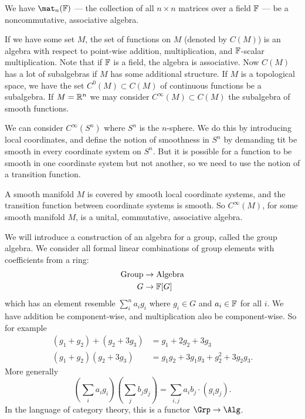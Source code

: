 \begin{ex}
We have $\mat_{n}(\Bbb{F})$ --- the collection of all $n\times n$
matrices over a field $\Bbb{F}$ --- be a noncommutative,
associative algebra.
\end{ex}
\begin{ex}
If we have some set $M$, the set of functions on $M$ (denoted by
$C(M)$) is an algebra with respect to point-wise addition,
multiplication, and $\Bbb{F}$-scalar multiplication. Note that if
$\Bbb{F}$ is a field, the algebra is associative. Now $C(M)$ has
a lot of subalgebras if $M$ has some additional structure. If $M$
is a topological space, we have the set $C^0(M)\subset C(M)$ of
continuous functions be a subalgebra. If $M=\Bbb{R}^{n}$ we may
consider $C^{\infty}(M)\subset C(M)$ the subalgebra of smooth functions.
\end{ex}
\begin{ex}
We can consider $C^{\infty}(S^{n})$ where $S^n$ is the
$n$-sphere. We do this by introducing local coordinates, and
define the notion of smoothness in $S^n$ by demanding tit be
smooth in every coordinate system on $S^n$. But it is possible
for a function to be smooth in one coordinate system but not
another, so we need to use the notion of a transition function.
\end{ex}

A smooth manifold $M$ is covered by smooth local coordinate
systems, and the transition function between coordinate systems
is smooth. So $C^{\infty}(M)$, for some smooth manifold $M$, is a
unital, commutative, associative algebra.

We will introduce a construction of an algebra for a group,
called the group algebra. We consider all formal linear
combinations of group elements with coefficients from a ring:
\begin{align}
\hbox{Group}&\to\hbox{Algebra}\nonumber\\
G&\to\Bbb{F}[G]
\end{align}
which has an element resemble $\sum_{i}^{n}a_{i}g_{i}$ where
$g_{i}\in G$ and $a_{i}\in\Bbb{F}$ for all $i$. We have addition
be component-wise, and multiplication also be component-wise.
So for example
\begin{subequations}
\begin{align}
(g_{1}+g_{2})+(g_{2}+3g_{3}) &= g_{1}+2g_{2}+3g_{3}\\
(g_{1}+g_{2})(g_{2}+3g_{3}) &= g_{1}g_{2}+3g_{1}g_{3}+g_{2}^{2}+3g_{2}g_{3}.
\end{align}
\end{subequations}
More generally
\begin{equation}
(\sum_{i}a_{i}g_{i})(\sum_{j}b_{j}g_{j})=\sum_{i,j}a_{i}b_{j}\cdot(g_{i}g_{j}).
\end{equation}
In the language of category theory, this is a functor $\Grp\to\Alg$.

